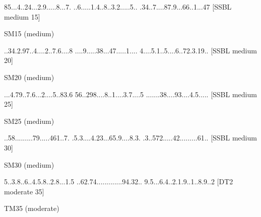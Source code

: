 \documentclass[twoside]{article}
\begin{document}
\renewcommand*{\puzzlefile}{sm15.sud}
\writepuzzle%
{85...4..2}{4...2.9..}{...8...7.}%
{..6.....1}{.4..8..3.}{2.....5..}%
{.34..7...}{.87.9...6}{6..1...47}%
[SSBL medium 15]
\vfill
\begin{minipage}{0.95\linewidth}\begin{center}
SM15 (medium) \\
\end{center}\end{minipage}

\renewcommand*{\puzzlefile}{sm20.sud}
\writepuzzle%
{..34.2.97}{..4....2.}{.7.6....8}%
{....9....}{.38...47.}{....1....}%
{4....5.1.}{.5....6..}{72.3.19..}%
[SSBL medium 20]
\vfill
\begin{minipage}{0.95\linewidth}\begin{center}
SM20 (medium) \\
\end{center}\end{minipage}

\renewcommand*{\puzzlefile}{sm25.sud}
\writepuzzle%
{...4.79..}{7.6...2..}{..5..83.6}%
{56..298..}{..8..1...}{.3.7....5}%
{.......38}{....93...}{.4.5.....}%
[SSBL medium 25]
\vfill
\begin{minipage}{0.95\linewidth}\begin{center}
SM25 (medium) \\
\end{center}\end{minipage}

\renewcommand*{\puzzlefile}{sm30.sud}
\writepuzzle%
{..58.....}{....79...}{..461..7.}%
{.5.3....4}{.23...65.}{9....8.3.}%
{.3..572..}{...42....}{.....61..}%
[SSBL medium 30]
\vfill
\begin{minipage}{0.95\linewidth}\begin{center}
SM30 (medium) \\
\end{center}\end{minipage}

\renewcommand*{\puzzlefile}{tm35.sud}
\writepuzzle%
{5..3.8..6}{..4.5.8..}{2.8...1.5}%
{..62.74..}{.........}{..94.32..}%
{9.5...6.4}{..2.1.9..}{1..8.9..2}%
[DT2 moderate 35]
\vfill
\begin{minipage}{0.95\linewidth}\begin{center}
TM35 (moderate) \\
\end{center}\end{minipage}
\end{document}
